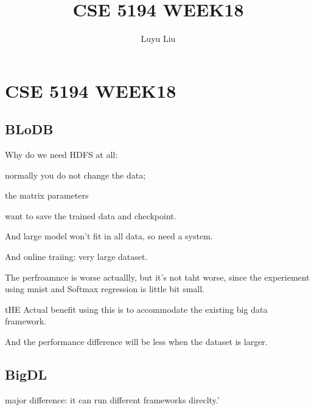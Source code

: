 \documentclass[12pt]{article}
\begin{document}
\author{Luyu Liu}

\newcommand\para{\par\refstepcounter{para}\thepara\space}

\section*{CSE 5194 WEEK18}
\title{CSE 5194 WEEK18}

\subsection{BLoDB}
Why do we need HDFS at all:

normally you do not change the data;

the matrix parameters

want to save the trained data and checkpoint.

And large model won't fit in all data, so need a system.

And online traiing: very large dataset.


The perfroamnce is worse actuallly, but it's not taht worse, since the experiement using mnist and Softmax regression is little bit small.

tHE Actual benefit using this is to accommodate the existing big data framework.

And the performance difference will be less when the dataset is larger.

\subsection{BigDL}
major difference: it can run different frameworks direclty.'
\end{document}
